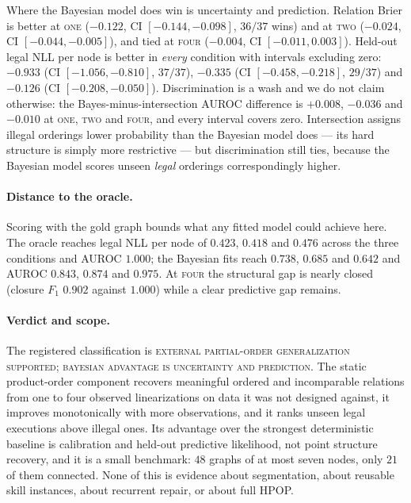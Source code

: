 Where the Bayesian model does win is uncertainty and prediction. Relation Brier
is better at \textsc{one} ($-0.122$, CI $[-0.144, -0.098]$, $36/37$ wins) and at
\textsc{two} ($-0.024$, CI $[-0.044, -0.005]$), and tied at \textsc{four}
($-0.004$, CI $[-0.011, 0.003]$). Held-out legal NLL per node is better in
\emph{every} condition with intervals excluding zero: $-0.933$
(CI $[-1.056, -0.810]$, $37/37$), $-0.335$ (CI $[-0.458, -0.218]$, $29/37$) and
$-0.126$ (CI $[-0.208, -0.050]$). Discrimination is a wash and we do not claim
otherwise: the Bayes-minus-intersection AUROC difference is $+0.008$, $-0.036$
and $-0.010$ at \textsc{one}, \textsc{two} and \textsc{four}, and every interval
covers zero. Intersection assigns illegal orderings lower probability than the
Bayesian model does --- its hard structure is simply more restrictive --- but
discrimination still ties, because the Bayesian model scores unseen \emph{legal}
orderings correspondingly higher.

\paragraph{Distance to the oracle.}
Scoring with the gold graph bounds what any fitted model could achieve here.
The oracle reaches legal NLL per node of $0.423$, $0.418$ and $0.476$ across the
three conditions and AUROC $1.000$; the Bayesian fits reach $0.738$, $0.685$ and
$0.642$ and AUROC $0.843$, $0.874$ and $0.975$. At \textsc{four} the structural
gap is nearly closed (closure $F_1$ $0.902$ against $1.000$) while a clear
predictive gap remains.

\paragraph{Verdict and scope.}
The registered classification is \textsc{external partial-order generalization
supported; bayesian advantage is uncertainty and prediction}. The static
product-order component recovers meaningful ordered and incomparable relations
from one to four observed linearizations on data it was not designed against, it
improves monotonically with more observations, and it ranks unseen legal
executions above illegal ones. Its advantage over the strongest deterministic
baseline is calibration and held-out predictive likelihood, not point structure
recovery, and it is a small benchmark: $48$ graphs of at most seven nodes, only
$21$ of them connected. None of this is evidence about segmentation, about
reusable skill instances, about recurrent repair, or about full HPOP.

